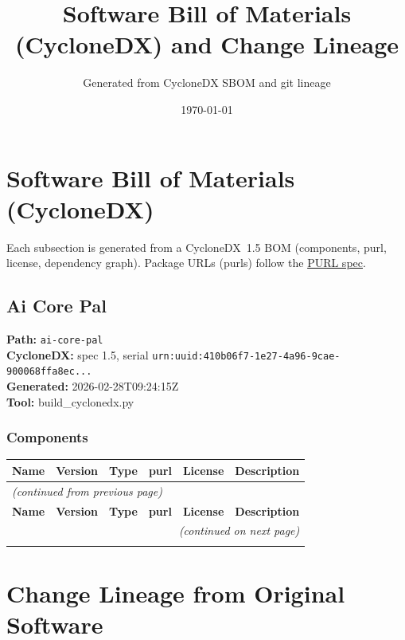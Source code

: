 \documentclass[11pt,a4paper]{article}
\title{\textbf{Software Bill of Materials (CycloneDX) and Change Lineage}}
\author{Generated from CycloneDX SBOM and git lineage}
\date{\today}
\begin{document}
\maketitle
\tableofcontents
\newpage
\section{Software Bill of Materials (CycloneDX)}
Each subsection is generated from a CycloneDX~1.5 BOM (components, purl, license, dependency graph). Package URLs (purls) follow the \href{https://github.com/package-url/purl-spec}{PURL spec}.

\subsection{Ai Core Pal}
\textbf{Path:} \texttt{ai-core-pal}
\\ \textbf{CycloneDX:} spec 1.5, serial \texttt{urn:uuid:410b06f7-1e27-4a96-9cae-900068ffa8ec...}
\\ \textbf{Generated:} 2026-02-28T09:24:15Z
\\ \textbf{Tool:} build\_cyclonedx.py

\subsubsection*{Components}
\begin{longtable}{|p{4cm}|p{2cm}|p{1.6cm}|p{5cm}|p{1.5cm}|p{3.5cm}|}
\toprule
\rowcolor{sbomhdr}\textbf{Name} & \textbf{Version} & \textbf{Type} & \textbf{purl} & \textbf{License} & \textbf{Description} \\
\midrule
\endfirsthead
\multicolumn{6}{l}{\small\itshape (continued from previous page)} \\
\toprule
\rowcolor{sbomhdr}\textbf{Name} & \textbf{Version} & \textbf{Type} & \textbf{purl} & \textbf{License} & \textbf{Description} \\
\midrule
\endhead
\midrule
\multicolumn{6}{r}{\small\itshape (continued on next page)} \\
\endfoot
\bottomrule
\endlastfoot
\end{longtable}

\newpage
\section{Change Lineage from Original Software}
\end{document}

